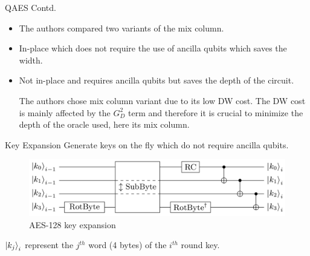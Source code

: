 \begin{frame}{QAES Contd.}
\begin{itemize}
    \item The authors compared two variants of the mix column. \pause
    \item In-place which does not require the use of ancilla qubits which saves the width. \pause
    \item Not in-place and requires ancilla qubits but saves the depth of the circuit. \pause
    \begin{center}
\begin{table}[h!]
    \centering
    \caption{Comparison of cost of mix column variants}
    \label{tab:aesmc}
\end{table}
\end{center}
\pause
The authors chose \cite{aesmc} mix column variant due to its low DW cost. \pause The DW cost is mainly affected by the $G_D^2$ term and therefore it is crucial to minimize the depth of the oracle used, here its mix column.
\end{itemize}
\end{frame}
\begin{frame}{Key Expansion}
    Generate keys on the fly which do not require ancilla qubits.
    \begin{figure}[h!]
    \centering
    \includegraphics[width=\linewidth]{aes/aeske.png}
    \caption{AES-128 key expansion \cite{aeslowmc}}
    \label{fig:aeske}
\end{figure}
$\ket{k_j}_i$ represent the $j^{th}$ word (4 bytes) of the $i^{th}$ round key.
\end{frame}

